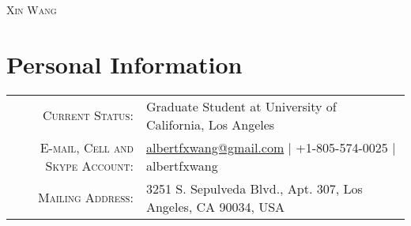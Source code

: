 \documentclass[letterpaper,10pt]{article}
\begin{document}
\par{\centering
  {\huge \textsc{Xin Wang}}
\par}

\section{Personal Information}
\begin{tabular}{rl}
    \textsc{Current Status:}  & Graduate Student at University of California, Los Angeles \\
    \textsc{E-mail, Cell and Skype Account:}  & \href{mailto:albertfxwang@gmail.com}{albertfxwang@gmail.com}  |  +1-805-574-0025  |  albertfxwang \\
    \textsc{Mailing Address:} & 3251 S. Sepulveda Blvd., Apt. 307, Los Angeles, CA 90034, USA \\
\end{tabular}


\end{document}
